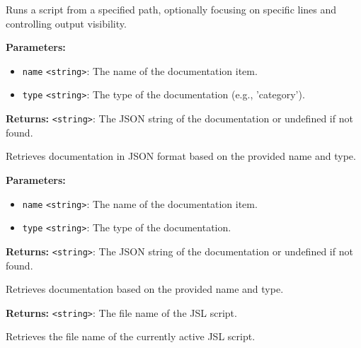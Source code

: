 \documentclass[12pt,a4paper]{article}
\begin{document}
\noindent Runs a script from a specified path, optionally focusing on specific lines and controlling output visibility.

\vspace{5mm}
\noindent {}


\noindent \textbf{Parameters:}
\begin{itemize}
  \item \texttt{name} \texttt{<string>}: The name of the documentation item.
  \item \texttt{type} \texttt{<string>}: The type of the documentation (e.g., 'category').
\end{itemize}

\noindent \textbf{Returns:} \texttt{<string>}: The JSON string of the documentation or undefined if not found.

\noindent Retrieves documentation in JSON format based on the provided name and type.

\vspace{5mm}
\noindent {}


\noindent \textbf{Parameters:}
\begin{itemize}
  \item \texttt{name} \texttt{<string>}: The name of the documentation item.
  \item \texttt{type} \texttt{<string>}: The type of the documentation.
\end{itemize}

\noindent \textbf{Returns:} \texttt{<string>}: The JSON string of the documentation or undefined if not found.

\noindent Retrieves documentation based on the provided name and type.

\vspace{5mm}
\noindent {}


\noindent \textbf{Returns:} \texttt{<string>}: The file name of the JSL script.

\noindent Retrieves the file name of the currently active JSL script.

\vspace{5mm}
\noindent {}
\end{document}
